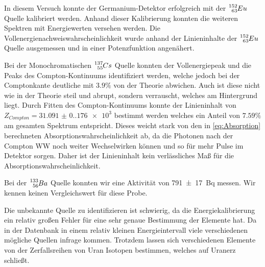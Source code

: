 In diesem Versuch konnte der Germanium-Detektor erfolgreich mit der $\ce{^{152}_{63}}Eu$ Quelle kalibriert werden.
Anhand dieser Kalibrierung konnten die weiteren Spektren mit Energiewerten versehen werden.
Die Vollenergienachweiswahrscheinlichkeit wurde anhand der Linieninhalte
der $\ce{^{152}_{63}}Eu$ Quelle ausgemessen und in einer Potenzfunktion angenähert.

Bei der Monochromatischen $\ce{^{137}_{55}}Cs$ Quelle konnten der Vollenergiepeak und
die Peaks des Compton-Kontinuums identifiziert werden, welche jedoch bei der Comptonkante deutliche mit $3.9\%$ von der Theorie abwichen. 
Auch ist diese nicht wie in der Theorie steil und abrupt, sondern verrauscht, welches am Hintergrund liegt. 
Durch Fitten des Compton-Kontinuums konnte der Linieninhalt von $Z_{Compton}=\num{31.091(0.176)e3}$ bestimmt werden welches ein Anteil von $7.59\%$
am gesamten Spektrum entspricht. 
Dieses weicht stark von den in \eqref{eq:Absorption} berechneten Absorptionswahrscheinlichkeit ab, 
da die Photonen nach der Compton WW noch weiter Wechselwirken können und so für mehr Pulse im Detektor sorgen. 
Daher ist der Linieninhalt kein verlässliches Maß für die Absorptionswahrscheinlichkeit. 

Bei der $\ce{^{133}_{56}}Ba$ Quelle konnten wir eine Aktivität von \qty{791(17)}{\becquerel} messen.
Wir kennen keinen Vergleichswert für diese Probe.

Die unbekannte Quelle zu identifizieren ist schwierig, da die Energiekalibrierung ein relativ großen Fehler für eine sehr genaue Bestimmung der Elemente hat. 
Da in der Datenbank in einem relativ kleinen Energieintervall viele verschiedenen mögliche Quellen infrage kommen. 
Trotzdem lassen sich verschiedenen Elemente von der Zerfallsreihen von Uran Isotopen bestimmen, welches auf Uranerz schließt.


\newpage
\printbibliography

